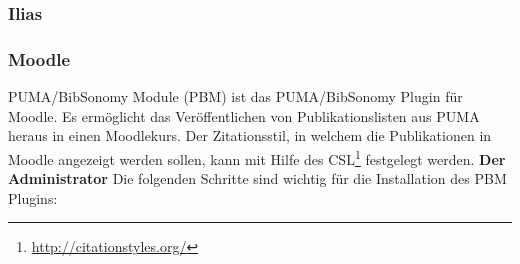 \subsubsection{Ilias}
\subsubsection{Moodle}
PUMA/BibSonomy Module (PBM) ist das PUMA/BibSonomy Plugin für Moodle. Es ermöglicht das Veröffentlichen von Publikationslisten aus PUMA heraus in einen Moodlekurs. Der Zitationsstil, in welchem die Publikationen in Moodle angezeigt werden sollen, kann mit Hilfe des CSL\footnote{\url{http://citationstyles.org/}} festgelegt werden.\newline
\textbf{ Der Administrator}\newline
Die folgenden Schritte sind wichtig für die Installation des PBM Plugins: 
